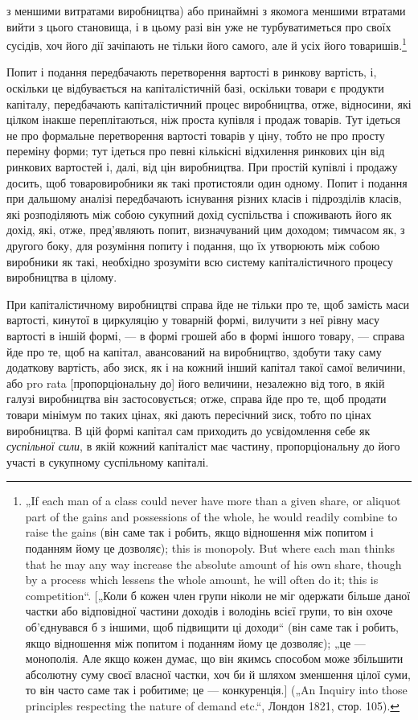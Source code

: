 \parcont{}  %
з меншими витратами виробництва) або принаймні з якомога меншими
втратами вийти з цього становища, і в цьому разі він уже не
турбуватиметься про своїх сусідів, хоч його дії зачіпають не тільки
його самого, але й усіх його товаришів.\footnote{
„If each man of a class could never have more than a given share, or
aliquot part of the gains and possessions of the whole, he would readily combine
to raise the gains (він саме так і робить, якщо відношення між попитом і поданням
йому це дозволяє); this is monopoly. But where each man thinks that he
may any way increase the absolute amount of his own share, though by a process
which lessens the whole amount, he will often do it; this is competition“. [„Коли б
кожен член групи ніколи не міг одержати більше даної частки або відповідної
частини доходів і володінь всієї групи, то він охоче об’єднувався б з іншими,
щоб підвищити ці доходи“ (він саме так і робить, якщо відношення між попитом
і поданням йому це дозволяє); „це — монополія. Але якщо кожен думає,
що він якимсь способом може збільшити абсолютну суму своєї власної частки,
хоч би й шляхом зменшення цілої суми, то він часто саме так і робитиме; це —
конкуренція.] („An Inquiry into those principles respecting the nature of demand
etc.“, Лондон 1821, стор. 105).
}

Попит і подання передбачають перетворення вартості в ринкову
вартість, і, оскільки це відбувається на капіталістичній
базі, оскільки товари є продукти капіталу, передбачають капіталістичний
процес виробництва, отже, відносини, які цілком інакше
переплітаються, ніж проста купівля і продаж товарів. Тут ідеться
не про формальне перетворення вартості товарів у ціну, тобто
не про просту переміну форми; тут ідеться про певні кількісні
відхилення ринкових цін від ринкових вартостей і, далі, від цін виробництва.
При простій купівлі і продажу досить, щоб товаровиробники
як такі протистояли один одному. Попит і подання при
дальшому аналізі передбачають існування різних класів і підрозділів
класів, які розподіляють між собою сукупний дохід суспільства
і споживають його як дохід, які, отже, пред’являють попит, визначуваний
цим доходом; тимчасом як, з другого боку, для розуміння
попиту і подання, що їх утворюють між собою виробники
як такі, необхідно зрозуміти всю систему капіталістичного
процесу виробництва в цілому.

При капіталістичному виробництві справа йде не тільки про те,
щоб замість маси вартості, кинутої в циркуляцію у товарній
формі, вилучити з неї рівну масу вартості в іншій формі, —
в формі грошей або в формі іншого товару, — справа йде про те,
щоб на капітал, авансований на виробництво, здобути таку саму
додаткову вартість, або зиск, як і на кожний інший капітал такої
самої величини, або pro rata [пропорціональну до] його величини,
незалежно від того, в якій галузі виробництва він застосовується;
отже, справа йде про те, щоб продати товари мінімум
по таких цінах, які дають пересічний зиск, тобто по цінах виробництва.
В цій формі капітал сам приходить до усвідомлення
себе як \emph{суспільної сили}, в якій кожний капіталіст має частину,
пропорціональну до його участі в сукупному суспільному капіталі.


